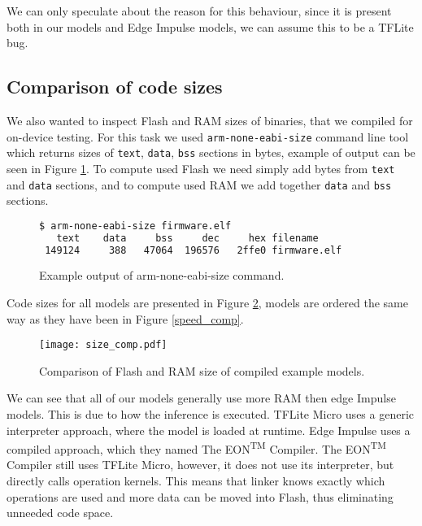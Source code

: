 We can only speculate about the reason for this behaviour, since it is present both in our models and Edge Impulse models, we can assume this to be a TFLite bug.

\subsection{ Comparison of code sizes}

We also wanted to inspect Flash and RAM sizes of binaries, that we compiled for on-device testing.
For this task we used \verb|arm-none-eabi-size| command line tool which returns sizes of \verb|text|, \verb|data|, \verb|bss| sections in bytes, example of output can be seen in Figure \ref{size_output}.
To compute used Flash we need simply add bytes from \verb|text| and \verb|data| sections, and to compute used RAM we add together \verb|data| and \verb|bss| sections\footnotemark.
\lstset{style=mystyle}
\begin{figure}[ht] 
\begin{lstlisting}[language=bash]
$ arm-none-eabi-size firmware.elf
   text	   data	    bss	    dec	    hex	filename
 149124	    388	  47064	 196576	  2ffe0	firmware.elf
\end{lstlisting}
\caption{ Example output of arm-none-eabi-size command.}
\label{size_output}
\end{figure}
Code sizes for all models are presented in Figure \ref{size_comp}, models are ordered the same way as they have been in Figure \ref{speed_comp}.
\begin{figure}[ht]
    \centering
    \texttt{[image: size\_comp.pdf]}
    \caption{ Comparison of Flash and RAM size of compiled example models.}
    \label{size_comp}
\end{figure}

We can see that all of our models generally use more RAM then edge Impulse models.
This is due to how the inference is executed.
TFLite Micro uses a generic interpreter approach, where the model is loaded at runtime.
Edge Impulse uses a compiled approach, which they named The EON\textsuperscript{TM} Compiler\cite{eon}.
The EON\textsuperscript{TM} Compiler still uses TFLite Micro, however, it does not use its interpreter, but directly calls operation kernels.
This means that linker knows exactly which operations are used and more data can be moved into Flash, thus eliminating unneeded code space\cite{eon}.


